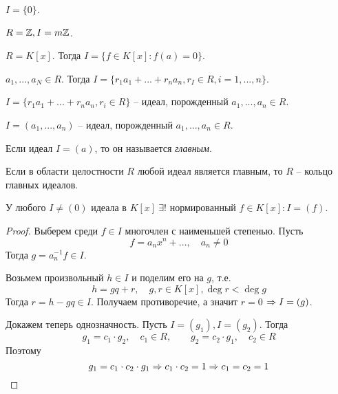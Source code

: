 \begin{Example}
	$I = \{0\}$.
\end{Example}

\begin{Example}
	$R = \mathbb{Z}, I = m\mathbb{Z}$. 
\end{Example}

\begin{Example}
	$R = K[x]$. Тогда $I = \{f \in K[x] : f(a) = 0\}$. 
\end{Example}

\begin{Example}
	$a_1, ..., a_N \in R$. Тогда $I = \{r_1 a_1 + ... + r_n a_n, r_I \in R, i = 1, ..., n\}$.
\end{Example}

\begin{Def}
	$I = \{r_1 a_1 + ... + r_n a_n, r_i \in R\}$ -- идеал, порожденный $a_1, ..., a_n \in R$. 
\end{Def}

\begin{notation}
	$I = (a_1, ..., a_n)$ -- идеал, порожденный $a_1, ..., a_n \in R$.
\end{notation}

\begin{Def}
	Если идеал $I = (a)$, то он называется \textit{главным}.
\end{Def}

\begin{Def}
	Если в области целостности $R$ любой идеал является главным, то $R$ -- кольцо главных идеалов.
\end{Def}

\begin{Thm}
	У любого $I \neq (0)$ идеала в $K[x] \ \exists !$ нормированный $f \in K[x] : I = (f)$. 
\end{Thm}

\begin{proof}
	Выберем среди $f \in I$ многочлен с наименьшей степенью. Пусть
	\[f = a_n x^n + ..., \quad a_n \neq 0\]
	Тогда $g = a_n^{-1} f \in I$. 
	
	Возьмем произвольный $h \in I$ и поделим его на $g$, т.е. 
	\[h = gq + r, \quad g, r \in K[x], \deg r < \deg g\] 
	Тогда $r = h - gq \in I$. Получаем противоречие, а значит $r = 0$ $\Rightarrow I = (g)$. 
	
	Докажем теперь однозначность.
	Пусть $I = (g_1), I = (g_2)$. Тогда
	\[g_1 = c_1 \cdot g_2, \quad c_1 \in R, \qquad g_2 = c_2 \cdot g_1, \quad c_2 \in R\]
	Поэтому
	\[g_1 = c_1 \cdot c_2 \cdot g_1 \Rightarrow c_1 \cdot c_2 = 1 \Rightarrow c_1 = c_2 = 1\]
\end{proof}

